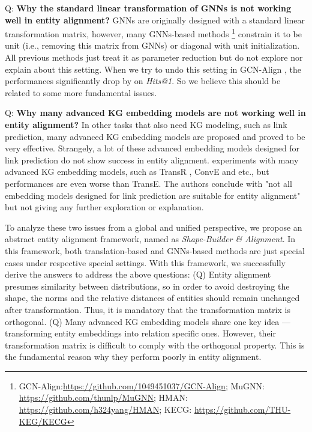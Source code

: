 \documentclass[sigconf,camera-ready]{acmart}
\begin{document}
Q: \textbf{Why the standard linear transformation of GNNs is not working well in entity alignment?}
GNNs are originally designed with a standard linear transformation matrix,
however, many GNNs-based methods \cite{DBLP:conf/emnlp/WangLLZ18,DBLP:conf/acl/CaoLLLLC19,li-etal-2019-semi,yang2019aligning}\footnote{GCN-Align:\url{https://github.com/1049451037/GCN-Align}; MuGNN: \url{https://github.com/thunlp/MuGNN}; HMAN: \url{https://github.com/h324yang/HMAN}; KECG: \url{https://github.com/THU-KEG/KECG}}
constrain it to be unit (i.e., removing this matrix from GNNs) or diagonal with unit initialization.
All previous methods just treat it as parameter reduction but do not explore nor explain about this setting.
When we try to undo this setting in GCN-Align \cite{DBLP:conf/emnlp/WangLLZ18}, the performances significantly drop by  on \emph{Hits@1}.
So we believe this should be related to some more fundamental issues.

Q: \textbf{Why many advanced KG embedding models are not working well in entity alignment?}
In other tasks that also need KG modeling, such as link prediction, many advanced KG embedding models are proposed and proved to be very effective.
Strangely, a lot of these advanced embedding models designed for link prediction do not show success in entity alignment.
\citet{DBLP:conf/semweb/SunHHCGQ19} experiments with many advanced KG embedding models, such as TransR \cite{DBLP:conf/aaai/LinLSLZ15}, ConvE \cite{DBLP:conf/aaai/DettmersMS018} and etc., but performances are even worse than TransE.
The authors conclude with "not all embedding models designed for link prediction are suitable for entity alignment" but not giving any further exploration or explanation.

To analyze these two issues from a global and unified perspective, we propose an abstract entity alignment framework, named as \emph{Shape-Builder \& Alignment}.
In this framework, both translation-based and GNNs-based methods are just special cases under respective special settings.
With this framework, we successfully derive the answers to address the above questions:
(Q) Entity alignment presumes similarity between distributions, so in order to avoid destroying the shape, the norms and the relative distances of entities should remain unchanged after transformation.
Thus, it is mandatory that the transformation matrix is orthogonal.
(Q) Many advanced KG embedding models share one key idea --- transforming  entity embeddings into relation specific ones.
However, their transformation matrix is difficult to comply with the orthogonal property.
This is the fundamental reason why they perform poorly in entity alignment.
\end{document}
